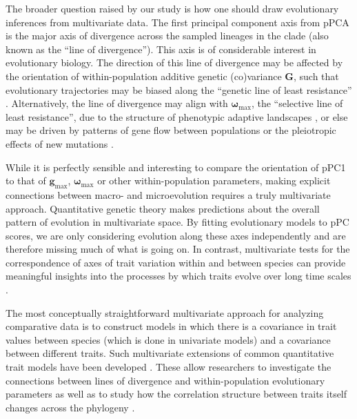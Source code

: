 \documentclass[a4paper,11pt]{article}
\begin{document}
The broader question raised by our study is how one should draw evolutionary inferences from multivariate data. The first principal component axis from pPCA is the major axis of divergence across the sampled lineages in the clade (also known as the ``line of divergence''). This axis is of considerable interest in evolutionary biology. The direction of this line of divergence may be affected by the orientation of within-population additive genetic (co)variance $\mathbf{G}$, such that evolutionary trajectories may be biased along the ``genetic line of least resistance'' \citep[i.e., divergence occurs primarily along the leading eigenvector of $\mathbf{G}$, $\mathbf{g}_{\text{max}}$;][]{Schluter1996}. Alternatively, the line of divergence may align with $\boldsymbol{\omega}_{\text{max}}$, the  ``selective line of least resistance'', due to the structure of phenotypic adaptive landscapes \citep{Arnoldetal2001, Jonesetal2007, Arnoldetal2008}, or else may be driven by patterns of gene flow between populations \citep{Guillaume2007} or the pleiotropic effects of new mutations \citep{Jonesetal2007, Hether2013}. 

While it is perfectly sensible and interesting to compare the orientation of pPC1 to that of $\mathbf{g}_{\text{max}}$, $\boldsymbol{\omega}_{\text{max}}$ or other within-population parameters, making explicit connections between macro- and microevolution requires a truly multivariate approach. Quantitative genetic theory \citep[e.g.,][]{Lande1979, LynchWalsh} makes predictions about the overall pattern of evolution in multivariate space. By fitting evolutionary models to pPC scores, we are only considering evolution along these axes independently and are therefore missing much of what is going on. In contrast, 
multivariate tests for the correspondence of axes of trait variation within and between species can provide meaningful insights into the processes by which traits evolve over long time scales \citep{Hohenlohe2008, Bolstad2014}. 

The most conceptually straightforward multivariate approach for analyzing comparative data is to construct models in which there is a covariance in trait values between species (which is done in univariate models) and a covariance between different traits. Such multivariate extensions of common quantitative trait models have been developed \citep{ButlerKing2004, RevellHarmon2008, Hohenlohe2008, RevellCollar2009, motmot}. These allow researchers to investigate the connections between lines of divergence and within-population evolutionary parameters \citep{Hohenlohe2008} as well as to study how the correlation structure between traits itself changes across the phylogeny \citep{RevellCollar2009}. 
\end{document}
